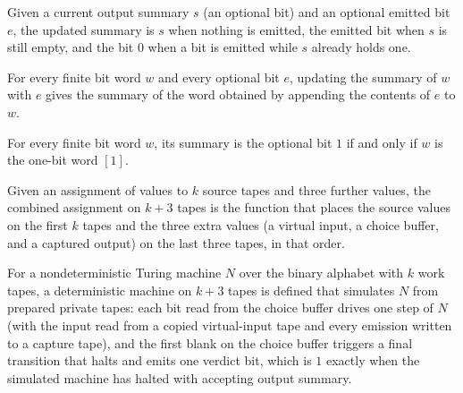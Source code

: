 \begin{definition}
\label{Complexity.captureEmission}
\leanok
Given a current output summary $s$ (an optional bit) and an optional emitted bit $e$, the updated summary is $s$ when nothing is emitted, the emitted bit when $s$ is still empty, and the bit $0$ when a bit is emitted while $s$ already holds one.
\end{definition}

\begin{lemma}
\label{Complexity.captureEmission_correct}
\leanok
{}
For every finite bit word $w$ and every optional bit $e$, updating the summary of $w$
with $e$ gives the summary of the word obtained by appending the contents of $e$ to $w$.
\end{lemma}

\begin{lemma}
\label{Complexity.capturedSummary_true}
\leanok
{}
For every finite bit word $w$, its summary is the optional bit $1$ if and only if $w$ is
the one-bit word $[1]$.
\end{lemma}

\begin{definition}
\label{Complexity.choiceTapes}
\leanok
Given an assignment of values to $k$ source tapes and three further values, the combined assignment on $k+3$ tapes is the function that places the source values on the first $k$ tapes and the three extra values (a virtual input, a choice buffer, and a captured output) on the last three tapes, in that order.
\end{definition}

\begin{definition}
\label{Complexity.choiceCore}
\leanok
{}
For a nondeterministic Turing machine $N$ over the binary alphabet with $k$ work tapes, a deterministic machine on $k+3$ tapes is defined that simulates $N$ from prepared private tapes: each bit read from the choice buffer drives one step of $N$ (with the input read from a copied virtual-input tape and every emission written to a capture tape), and the first blank on the choice buffer triggers a final transition that halts and emits one verdict bit, which is $1$ exactly when the simulated machine has halted with accepting output summary.
\end{definition}


